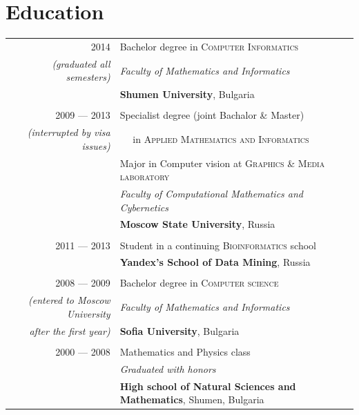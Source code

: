 \documentclass[a4paper,10pt]{article}
\def\myline{\color{linegray}\vline}
\begin{document}
\section{Education}
\hspace{0mm}\begin{tabular}{r!{\myline}p{14cm}}
  \textsc{2014}     &  Bachelor degree in \textsc{Computer Informatics}\\
        \small\textit{(graduated all semesters)}  &  \textit{Faculty of Mathematics and Informatics}\\
                                  &  \textbf{Shumen University}, Bulgaria\\

        \\
  \textsc{2009 --- 2013}     &  Specialist degree {\small(joint Bachalor \& Master)}\\
        \small\textit{(interrupted by visa issues)} &  $\quad$ in \textsc{Applied Mathematics and Informatics}\\
                                  &  Major in Computer vision at \textsc{Graphics \& Media laboratory}\\
                                  &  \textit{Faculty of Computational Mathematics and Cybernetics}\\
                                  &  \textbf{Moscow State University}, Russia\\

        \\
        \textsc{2011 --- 2013}     &  Student in a continuing \textsc{Bioinformatics} school\\
	                          &  \textbf{Yandex's School of Data Mining}, Russia\\
	

	\\
	\textsc{2008 --- 2009}     &  Bachelor degree in \textsc{Computer science}\\
        {\small\textit{(entered to Moscow University}} &  \textit{Faculty of Mathematics and Informatics}\\
        {\small\textit{after the first year)}} &  \textbf{Sofia University}, Bulgaria\\
	
	\\
	\textsc{2000 --- 2008}     &  Mathematics and Physics class\\
                                  &  \textit{Graduated with honors}\\
                                  &  \textbf{High school of Natural Sciences and Mathematics}, Shumen, Bulgaria\\
\end{tabular}
\par\smallskip
\end{document}
